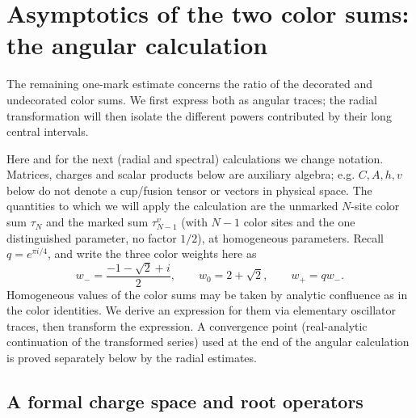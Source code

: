 \section{Asymptotics of the two color sums: the angular calculation}\label{c4:angular}

The remaining one-mark estimate concerns the ratio of the decorated and undecorated color sums.  We first express both as angular traces; the radial transformation will then isolate the different powers contributed by their long central intervals.


Here and for the next (radial and spectral) calculations we change notation. Matrices, charges and scalar products below are auxiliary algebra; e.g. \(C,A,h,v\) below do not denote a cup/fusion tensor or vectors in physical space. The quantities to which we will apply the calculation are the unmarked \(N\)-site color sum \(\tau_N\) and the marked sum \(\tau^v_{N-1}\) (with \(N-1\) color sites and the one distinguished parameter, no factor \(1/2\)), at homogeneous parameters. Recall \(q=e^{\pi i/4}\), and write the three color weights here as
\[
 w_-=\frac{-1-\sqrt{2}+i}{2},\qquad w_0=2+\sqrt{2},\qquad w_+=q w_- .
\]
Homogeneous values of the color sums may be taken by analytic confluence as in the color identities. We derive an expression for them via elementary oscillator traces, then transform the expression. A convergence point (real-analytic continuation of the transformed series) used at the end of the angular calculation is proved separately below by the radial estimates.

\subsection{A formal charge space and root operators}

